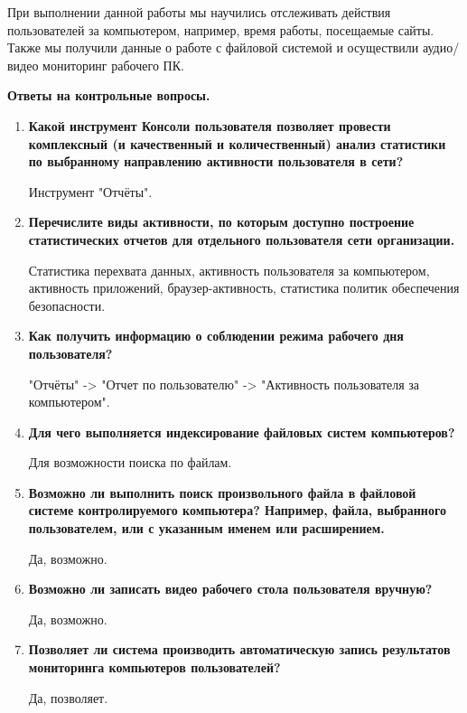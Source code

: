 \documentclass[a4paper,14pt]{extarticle}
\begin{document}
    При выполнении данной работы мы научились отслеживать действия пользователей за компьютером,
    например, время работы, посещаемые сайты. Также мы получили данные о работе с файловой системой 
    и осуществили аудио/видео мониторинг рабочего ПК.
    
    \textbf{Ответы на контрольные вопросы.}
    \vspace{-1ex}
    \begin{spacing}{1.15}
        \begin{enumerate}
            \itemsep-1ex
            \item \textbf{ Какой инструмент Консоли пользователя позволяет провести комплексный
        (и качественный и количественный) анализ статистики по выбранному направлению
        активности пользователя в сети? }

        \qquad Инструмент "Отчёты".
            \item \textbf{ Перечислите виды активности, по которым доступно построение
        статистических отчетов для отдельного пользователя сети организации. }

        \qquad Статистика перехвата данных, активность пользователя за компьютером, активность приложений,
        браузер-активность, статистика политик обеспечения безопасности.
            \item \textbf{ Как получить информацию о соблюдении режима рабочего дня пользователя? }

        \qquad "Отчёты" -> "Отчет по пользователю" -> "Активность пользователя за компьютером".
            \item \textbf{ Для чего выполняется индексирование файловых систем компьютеров? }

        \qquad Для возможности поиска по файлам.
            \item \textbf{ Возможно ли выполнить поиск произвольного файла в файловой системе
        контролируемого компьютера? Например, файла, выбранного пользователем, или с
        указанным именем или расширением. }

        \qquad Да, возможно.
            \item \textbf{ Возможно ли записать видео рабочего стола пользователя вручную? }

        \qquad Да, возможно.
            \item \textbf{ Позволяет ли система производить автоматическую запись результатов
        мониторинга компьютеров пользователей? }

        \qquad Да, позволяет.
        \end{enumerate}
    \end{spacing}
    
\end{document}

